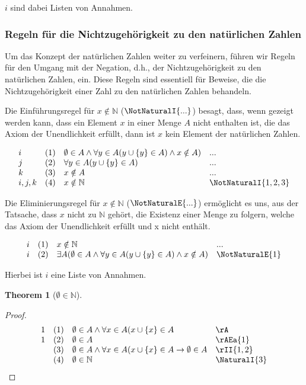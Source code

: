 \documentclass{book}
\theoremstyle{plain}
\newtheorem{theorem}{Theorem}
\theoremstyle{remark}
\theoremstyle{definition}
\begin{document}
\(i\) sind dabei Listen von Annahmen.

\subsubsection{Regeln für die Nichtzugehörigkeit zu den natürlichen Zahlen}
\label{rule:NotNaturalI} \label{rule:NotNaturalE}

Um das Konzept der natürlichen Zahlen weiter zu verfeinern, führen wir Regeln für den Umgang mit der Negation, d.h., der Nichtzugehörigkeit zu den natürlichen Zahlen, ein. Diese Regeln sind essentiell für Beweise, die die Nichtzugehörigkeit einer Zahl zu den natürlichen Zahlen behandeln.

Die Einführungsregel für \(x \notin \mathbb{N}\) (\(\NotNaturalI{...}\)) besagt, dass, wenn gezeigt werden kann, dass ein Element \(x\) in einer Menge \(A\) nicht enthalten ist, die das Axiom der Unendlichkeit erfüllt, dann ist \(x\) kein Element der natürlichen Zahlen.

\[
\begin{array}{llll}
	i & (1) & \emptyset\in A\land \forall y\in A(y\cup\{y\}\in A)\land x\notin A) & ... \\
        j & (2) &  \forall y\in A(y\cup\{y\}\in A) & ... \\
        k & (3) &  x\notin A & ... \\
	i,j,k & (4) & x \notin \mathbb{N} & \NotNaturalI{1,2,3} \\
\end{array}
\]

Die Eliminierungsregel für \(x \notin \mathbb{N}\) (\(\NotNaturalE{...}\)) ermöglicht es uns, aus der Tatsache, dass \(x\) nicht zu \(\mathbb{N}\) gehört, die Existenz einer Menge zu folgern, welche das Axiom der Unendlichkeit erfüllt und x nicht enthält.

\[
\begin{array}{llll}
	i & (1) & x \notin \mathbb{N} & ... \\
	i & (2) & \exists A(\emptyset\in A\land \forall y\in A(y\cup\{y\}\in A)\land x\notin A) & \NotNaturalE{1} \\
\end{array}
\]

Hierbei ist \(i\) eine Liste von Annahmen.


\label{EmptysetInNatural}
\begin{theorem}[\(\emptyset\in\mathbb{N}\)]
\end{theorem}
\begin{proof}
	\[
	\begin{array}{llll}
		1 & (1) & \emptyset\in A\land \forall x\in A(x\cup \{x\}\in A & \rA \\
		1 & (2) & \emptyset\in A & \rAEa{1} \\
		& (3) & \emptyset\in A\land \forall x\in A(x\cup \{x\}\in A\rightarrow \emptyset\in A & \rII{1,2} \\
		& (4) & \emptyset\in\mathbb{N} & \NaturalI{3} \\
	\end{array}
	\]
\end{proof}
\end{document}
